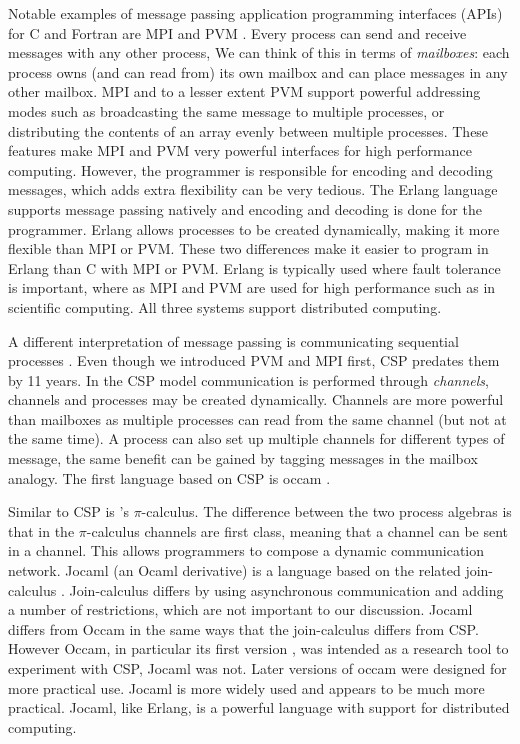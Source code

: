 Notable examples of message passing application programming interfaces (APIs)
for C and Fortran are MPI \citep{mpi} and PVM \citep{pvm}.
Every process can send and receive messages with any other process,
We can think of this in terms of \emph{mailboxes}:
each process owns (and can read from) its own mailbox and can place messages
in any other mailbox.
MPI and to a lesser extent PVM support powerful addressing modes
such as broadcasting the same message to multiple processes, or
distributing the contents of an array evenly between
multiple processes.
These features make MPI and PVM very powerful interfaces for high performance
computing.
However, the programmer is responsible for encoding and decoding messages,
which adds extra flexibility can be very tedious.
The Erlang language \citep{erlang} supports message passing natively and
encoding and decoding is done for the programmer.
Erlang allows processes to be created dynamically,
making it more flexible than MPI or PVM.
These two differences make it easier to program in Erlang than C with MPI or
PVM.
Erlang is typically used where fault tolerance is important,
where as MPI and PVM are used for high performance such as in scientific
computing.
All three systems support distributed computing.

A different interpretation of message passing is
communicating sequential processes \citep{hoare:1978:csp}.
Even though we introduced PVM and MPI first, CSP predates them by 11 years.
In the CSP model communication is performed through \emph{channels},
channels and processes may be created dynamically.
Channels are more powerful than mailboxes as multiple processes can read from
the same channel (but not at the same time).
A process can also set up multiple channels for different types of message,
the same benefit can be gained by tagging messages in the mailbox analogy.
The first language based on CSP is occam \citep{occam1, occam3}.

Similar to CSP is \citet{milner:pi}'s $\pi$-calculus.
The difference between the two process algebras is that in the $\pi$-calculus
channels are first class, meaning that a channel can be sent in a channel.
This allows programmers to compose a dynamic communication network.
Jocaml \citep{jocaml} (an Ocaml
\citep{ml-types, ocaml-modules, ocaml-bytecode, ocaml-native}
derivative) is a language based on the related join-calculus
\citep{join-calculas}.
Join-calculus differs by using asynchronous communication and adding a number
of restrictions, which are not important to our discussion.
Jocaml differs from Occam in the same ways that the join-calculus differs
from CSP.
However Occam, in particular its first version \citep{occam1},
was intended as a research tool to experiment with CSP, Jocaml was not.
Later versions of occam \citep{occam3} were designed for more practical use.
Jocaml is more widely used and appears to be much more practical.
Jocaml, like Erlang, is a powerful language with support for distributed
computing.

